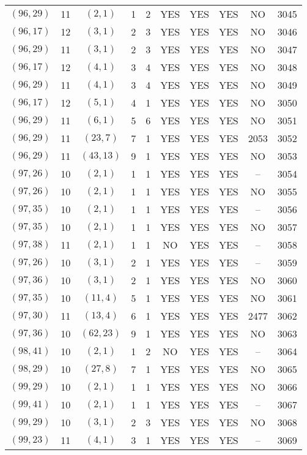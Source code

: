 \begin{longtable}{|c|c|c|c|c|c|c|c|c|c|}
$(96, 29)$ & 11 & $(2, 1)$ & 1 & 2 & YES & YES & YES & NO & 3045\\
$(96, 17)$ & 12 & $(3, 1)$ & 2 & 3 & YES & YES & YES & NO & 3046\\
$(96, 29)$ & 11 & $(3, 1)$ & 2 & 3 & YES & YES & YES & NO & 3047\\
$(96, 17)$ & 12 & $(4, 1)$ & 3 & 4 & YES & YES & YES & NO & 3048\\
$(96, 29)$ & 11 & $(4, 1)$ & 3 & 4 & YES & YES & YES & NO & 3049\\
$(96, 17)$ & 12 & $(5, 1)$ & 4 & 1 & YES & YES & YES & NO & 3050\\
$(96, 29)$ & 11 & $(6, 1)$ & 5 & 6 & YES & YES & YES & NO & 3051\\
$(96, 29)$ & 11 & $(23, 7)$ & 7 & 1 & YES & YES & YES & 2053 & 3052\\
$(96, 29)$ & 11 & $(43, 13)$ & 9 & 1 & YES & YES & YES & NO & 3053\\
$(97, 26)$ & 10 & $(2, 1)$ & 1 & 1 & YES & YES & YES & -- & 3054\\
$(97, 26)$ & 10 & $(2, 1)$ & 1 & 1 & YES & YES & YES & NO & 3055\\
$(97, 35)$ & 10 & $(2, 1)$ & 1 & 1 & YES & YES & YES & -- & 3056\\
$(97, 35)$ & 10 & $(2, 1)$ & 1 & 1 & YES & YES & YES & NO & 3057\\
$(97, 38)$ & 11 & $(2, 1)$ & 1 & 1 & NO & YES & YES & -- & 3058\\
$(97, 26)$ & 10 & $(3, 1)$ & 2 & 1 & YES & YES & YES & -- & 3059\\
$(97, 36)$ & 10 & $(3, 1)$ & 2 & 1 & YES & YES & YES & NO & 3060\\
$(97, 35)$ & 10 & $(11, 4)$ & 5 & 1 & YES & YES & YES & NO & 3061\\
$(97, 30)$ & 11 & $(13, 4)$ & 6 & 1 & YES & YES & YES & 2477 & 3062\\
$(97, 36)$ & 10 & $(62, 23)$ & 9 & 1 & YES & YES & YES & NO & 3063\\
$(98, 41)$ & 10 & $(2, 1)$ & 1 & 2 & NO & YES & YES & -- & 3064\\
$(98, 29)$ & 10 & $(27, 8)$ & 7 & 1 & YES & YES & YES & NO & 3065\\
$(99, 29)$ & 10 & $(2, 1)$ & 1 & 1 & YES & YES & YES & NO & 3066\\
$(99, 41)$ & 10 & $(2, 1)$ & 1 & 1 & YES & YES & YES & -- & 3067\\
$(99, 29)$ & 10 & $(3, 1)$ & 2 & 3 & YES & YES & YES & NO & 3068\\
$(99, 23)$ & 11 & $(4, 1)$ & 3 & 1 & YES & YES & YES & -- & 3069\\

\end{longtable}
